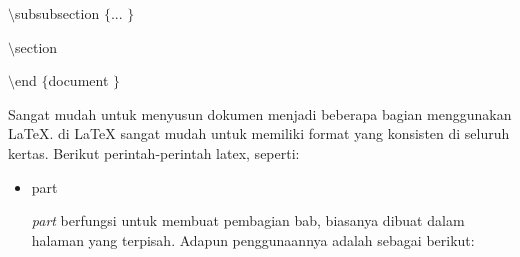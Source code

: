 {\fontsize{10pt}{10pt}\selectfont  $  \setminus  $subsubsection $  \{  $... $  \}  $}
 \par
\vspace{10pt}
{\fontsize{10pt}{10pt}\selectfont  $  \setminus  $section}
 \par
\vspace{10pt}
{\fontsize{10pt}{10pt}\selectfont  $  \setminus  $end $  \{  $document $  \}  $}
 \par
\vspace{12pt}
\hspace{0.50in} Sangat mudah untuk menyusun dokumen menjadi beberapa bagian menggunakan LaTeX. di LaTeX sangat mudah untuk memiliki format yang konsisten di seluruh kertas. Berikut perintah-perintah latex, seperti:
 \begin{itemize}
\item part \par
\textit{part} berfungsi untuk membuat pembagian bab, biasanya dibuat dalam halaman yang terpisah. Adapun penggunaannya adalah sebagai berikut:


\end{itemize}

